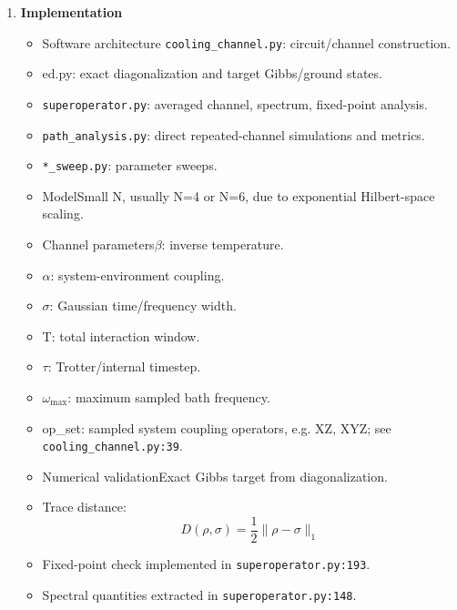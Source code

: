 \documentclass[11pt,a4paper]{article}
\begin{document}
\begin{itemize}
\begin{enumerate}
    \item \textbf{Implementation}
    \begin{itemize}
      \item Software architecture \texttt{cooling\_channel.py}: circuit/channel construction.
      \item ed.py: exact diagonalization and target Gibbs/ground states.
      \item \texttt{superoperator.py}: averaged channel, spectrum, fixed-point analysis.
      \item \texttt{path\_analysis.py}: direct repeated-channel simulations and metrics.
      \item \texttt{*\_sweep.py}: parameter sweeps.
      \item ModelSmall N, usually N=4 or N=6, due to exponential Hilbert-space scaling.
      \item Channel parameters$\beta$: inverse temperature.
      \item $\alpha$: system-environment coupling.
      \item $\sigma$: Gaussian time/frequency width.
      \item T: total interaction window.
      \item $\tau$: Trotter/internal timestep.
      \item $\omega_\text{max}$: maximum sampled bath frequency.
      \item op\_set: sampled system coupling operators, e.g. XZ, XYZ; see \texttt{cooling\_channel.py:39}.
      \item Numerical validationExact Gibbs target from diagonalization.
      \item Trace distance:
      \[
      D(\rho,\sigma)=\frac12\|\rho-\sigma\|_1
      \]
      \item Fixed-point check implemented in \texttt{superoperator.py:193}.
      \item Spectral quantities extracted in \texttt{superoperator.py:148}.
    \end{itemize}


\end{enumerate}
\end{itemize}
\end{document}
